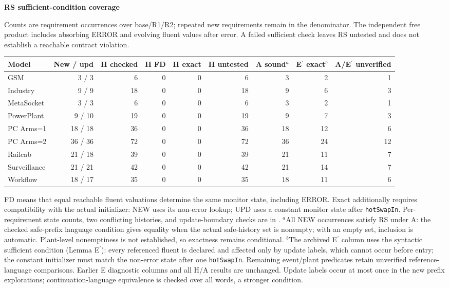 \noindent\textbf{RS sufficient-condition coverage}\par
Counts are requirement occurrences over base/R1/R2; repeated new requirements remain in the denominator. The independent free product includes absorbing ERROR and evolving fluent values after error. A failed sufficient check leaves RS untested and does not establish a reachable contract violation.
\begin{center}\scriptsize\begin{tabular}{@{}lrrrrrrrr@{}}\toprule
Model & New / upd & H checked & H FD & H exact & H untested & A sound$^a$ & E$^{\prime}$ exact$^b$ & A/E$^{\prime}$ unverified\\\midrule
GSM & 3 / 3 & 6 & 0 & 0 & 6 & 3 & 2 & 1\\
Industry & 9 / 9 & 18 & 0 & 0 & 18 & 9 & 6 & 3\\
MetaSocket & 3 / 3 & 6 & 0 & 0 & 6 & 3 & 2 & 1\\
PowerPlant & 9 / 10 & 19 & 0 & 0 & 19 & 9 & 7 & 3\\
PC Arms=1 & 18 / 18 & 36 & 0 & 0 & 36 & 18 & 12 & 6\\
PC Arms=2 & 36 / 36 & 72 & 0 & 0 & 72 & 36 & 24 & 12\\
Railcab & 21 / 18 & 39 & 0 & 0 & 39 & 21 & 11 & 7\\
Surveillance & 21 / 21 & 42 & 0 & 0 & 42 & 21 & 14 & 7\\
Workflow & 18 / 17 & 35 & 0 & 0 & 35 & 18 & 11 & 6\\
\bottomrule\end{tabular}\end{center}
FD means that equal reachable fluent valuations determine the same monitor state, including ERROR. Exact additionally requires compatibility with the actual initializer: NEW uses its non-error lookup; UPD uses a constant monitor state after \texttt{hotSwapIn}. Per-requirement state counts, two conflicting histories, and update-boundary checks are in .
$^a$All \RSAInclusionNew{} NEW occurrences satisfy RS under A: the checked safe-prefix language condition gives equality when the actual safe-history set is nonempty; with an empty set, inclusion is automatic. Plant-level nonemptiness is not established, so exactness remains conditional. $^b$The archived E$^{\prime}$ column uses the syntactic sufficient condition (Lemma E$^{\prime}$): every referenced fluent is declared and affected only by update labels, which cannot occur before entry; the constant initializer must match the non-error state after one \texttt{hotSwapIn}. Remaining event/plant predicates retain unverified reference-language comparisons. Earlier E diagnostic columns and all H/A results are unchanged. Update labels occur at most once in the new prefix explorations; continuation-language equivalence is checked over all words, a stronger condition.
